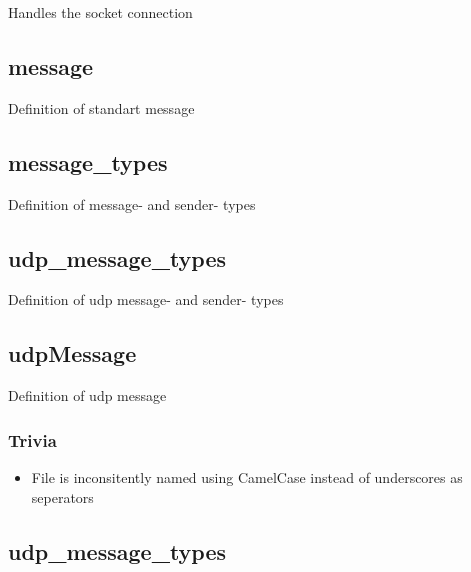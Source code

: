 Handles the socket connection 

\subsection{message}

Definition of standart message

\subsection{message\_types}

Definition of message- and sender- types 

\subsection{udp\_message\_types}
Definition of udp message- and sender- types 

\subsection{udpMessage}
Definition of udp message


\subsubsection{Trivia}

\begin{itemize}
	\item File is inconsitently named using CamelCase instead of underscores as seperators
\end{itemize}

\subsection{udp\_message\_types}
